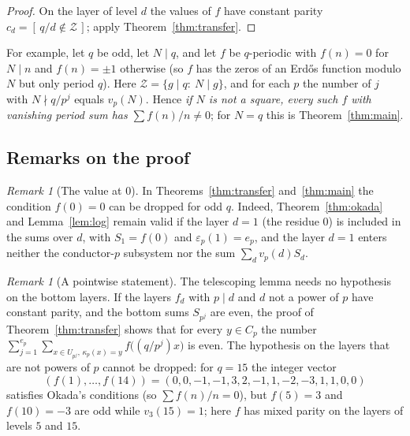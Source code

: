 \documentclass[11pt]{amsart}
\theoremstyle{definition}
\theoremstyle{remark}
\newtheorem{remark}[theorem]{Remark}
\numberwithin{equation}{section}
\begin{document}
\begin{proof}
On the layer of level $d$ the values of $f$ have constant parity $c_d=[\,q/d\notin\mathcal Z\,]$; apply Theorem~\ref{thm:transfer}.
\end{proof}

For example, let $q$ be odd, let $N\mid q$, and let $f$ be $q$-periodic with $f(n)=0$ for $N\mid n$ and $f(n)=\pm1$ otherwise (so $f$ has the zeros of an Erd\H{o}s function modulo $N$ but only period $q$).
Here $\mathcal Z=\{g\mid q:\ N\mid g\}$, and for each $p$ the number of $j$ with $N\nmid q/p^j$ equals $v_p(N)$.
Hence \emph{if $N$ is not a square, every such $f$ with vanishing period sum has $\sum f(n)/n\neq0$}; for $N=q$ this is Theorem~\ref{thm:main}.

\subsection{Remarks on the proof}
\begin{remark}[The value at $0$]
In Theorems~\ref{thm:transfer} and~\ref{thm:main} the condition $f(0)=0$ can be dropped for odd $q$.
Indeed, Theorem~\ref{thm:okada} and Lemma~\ref{lem:log} remain valid if the layer $d=1$ (the residue $0$) is included in the sums over $d$, with $S_1=f(0)$ and $\varepsilon_p(1)=e_p$, and the layer $d=1$ enters neither the conductor-$p$ subsystem nor the sum $\sum_dv_p(d)S_d$.
\end{remark}

\begin{remark}[A pointwise statement]
The telescoping lemma needs no hypothesis on the bottom layers.
If the layers $f_d$ with $p\mid d$ and $d$ not a power of $p$ have constant parity, and the bottom sums $S_{p^j}$ are even, the proof of Theorem~\ref{thm:transfer} shows that for every $y\in C_p$ the number $\sum_{j=1}^{e_p}\sum_{x\in U_{p^j},\,\kappa_p(x)=y}f\bigl((q/p^j)x\bigr)$ is even.
The hypothesis on the layers that are not powers of $p$ cannot be dropped: for $q=15$ the integer vector
\[
(f(1),\dots,f(14))=(0,0,-1,-1,3,2,-1,1,-2,-3,1,1,0,0)
\]
satisfies Okada's conditions (so $\sum f(n)/n=0$), but $f(5)=3$ and $f(10)=-3$ are odd while $v_3(15)=1$; here $f$ has mixed parity on the layers of levels $5$ and $15$.
\end{remark}
\end{document}
